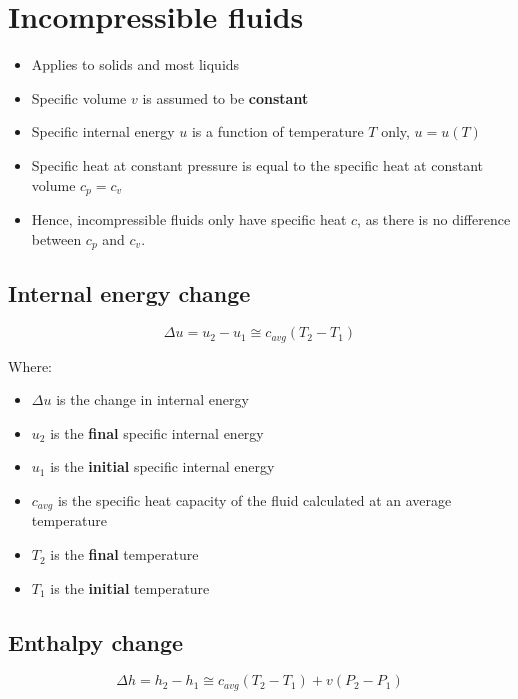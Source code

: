 \documentclass[11pt]{article}
\begin{document}
\newpage

\section{Incompressible fluids}
\label{sec:org0c5d90d}
\begin{itemize}
\item Applies to solids and most liquids
\item Specific volume \(v\) is assumed to be \textbf{constant}
\item Specific internal energy \(u\) is a function of temperature \(T\) only, \(u = u(T)\)
\item Specific heat at constant pressure is equal to the specific heat at constant volume \(c_p = c_v\)
\item Hence, incompressible fluids only have specific heat \(c\), as there is no difference between \(c_p\) and \(c_v\).
\end{itemize}

\subsection{Internal energy change}
\label{sec:orge41575a}
\[\Delta u = u_2 - u_1 \cong c_{avg} \left(T_2 - T_1 \right)\]

Where:
\begin{itemize}
\item \(\Delta u\) is the change in internal energy
\item \(u_2\) is the \textbf{final} specific internal energy
\item \(u_1\) is the \textbf{initial} specific internal energy
\item \(c_{avg}\) is the specific heat capacity of the fluid calculated at an average temperature
\item \(T_2\) is the \textbf{final} temperature
\item \(T_1\) is the \textbf{initial} temperature
\end{itemize}

\newpage

\subsection{Enthalpy change}
\label{sec:org4f2ae14}
\[\Delta h = h_2 - h_1 \cong c_{avg} \left(T_2 - T_1 \right) + v \left(P_2 - P_1 \right)\]
\end{document}
